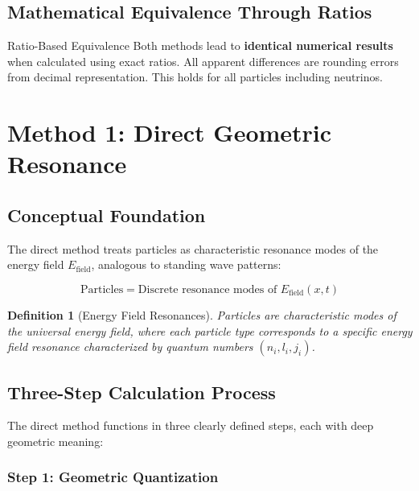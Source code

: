 \documentclass[12pt,a4paper]{article}
\newcommand{\Efield}{E_{\text{field}}}
\newtheorem{definition}[theorem]{Definition}
\begin{document}
	\subsection{Mathematical Equivalence Through Ratios}
	\label{subsec:mathematical_equivalence}
	
	\begin{keyresult}{Ratio-Based Equivalence}{}
		Both methods lead to \textbf{identical numerical results} when calculated using exact ratios. All apparent differences are rounding errors from decimal representation. This holds for all particles including neutrinos.
	\end{keyresult}
	
	\section{Method 1: Direct Geometric Resonance}
	\label{sec:direct_geometric_method}
	
	\subsection{Conceptual Foundation}
	\label{subsec:direct_principles}
	
	The direct method treats particles as characteristic resonance modes of the energy field $\Efield$, analogous to standing wave patterns:
	
	\begin{equation}
		\text{Particles} = \text{Discrete resonance modes of } \Efield(x,t)
	\end{equation}
	
	\begin{definition}[Energy Field Resonances]
		Particles are characteristic modes of the universal energy field, where each particle type corresponds to a specific energy field resonance characterized by quantum numbers $(n_i, l_i, j_i)$.
	\end{definition}
	
	\subsection{Three-Step Calculation Process}
	\label{subsec:three_step_process}
	
	The direct method functions in three clearly defined steps, each with deep geometric meaning:
	
	\subsubsection{Step 1: Geometric Quantization}
	\label{subsubsec:step1}
	
\end{document}
